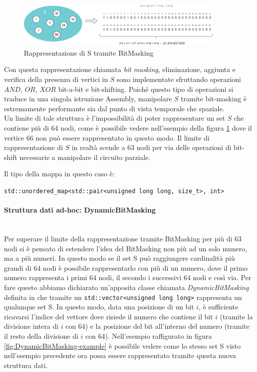 \begin{figure}[h]
	\centering
	\includegraphics[width=0.9\textwidth]{./images/BitMasking Example.png}
	\caption{Rappresentazione di S tramite BitMasking}
	\label{fig:bitmasking-example}
\end{figure}

\noindent Con questa rappresentazione chiamata \textit{bit masking}, eliminazione, aggiunta e verifica della presenza di vertici in $S$ sono implementate sfruttando operazioni $AND$, $OR$, $XOR$ bit-a-bit e bit-shifting.
Poiché questo tipo di operazioni si traduce in una singola istruzione Assembly, manipolare $S$ tramite bit-masking è estremamente performante sia dal punto di vista temporale che spaziale. \\

\noindent Un limite di tale struttura è l'impossibilità di poter rappresentare un set $S$ che contiene più di 64 nodi, come è possibile vedere nell'esempio della figura \ref{fig:bitmasking-example} dove il vertice 66 non può essere rappresentato in questo modo. Il limite di rappresentazione di $S$ in realtà scende a 63 nodi per via delle operazioni di bit-shift necessarie a manipolare il circuito parziale.

\noindent Il tipo della mappa in questo caso è:

\begin{center}
    \texttt{std::unordered_map<std::pair<unsigned long long, size_t>, int>}
\end{center}

\paragraph{Struttura dati ad-hoc: DynamicBitMasking}\mbox{} \\

Per superare il limite della rappresentazione tramite BitMasking per più di 63 nodi si è pensato di estendere l'idea del BitMasking non più ad un solo numero, ma a più numeri. In questo modo se il set S può raggiungere cardinalità più grandi di 64 nodi è possibile rappresentarlo con più di un numero, dove il primo numero rappresenta i primi 64 nodi, il secondo i successivi 64 nodi e così via. Per fare questo abbiamo dichiarato un'apposita classe chiamata \textit{DynamicBitMasking} definita in  che tramite un \texttt{std::vector<unsigned long long>} rappresenta un qualunque set S. In questo modo, data una posizione di un bit $i$, è sufficiente ricavarsi l'indice del vettore dove risiede il numero che contiene il bit $i$ (tramite la divisione intera di $i$ con 64) e la posizione del bit all'interno del numero (tramite il resto della divisione di $i$ con 64). Nell'esempio raffigurato in figura \ref{fig:DynamicBitMasking-example} è possibile vedere come lo stesso set S visto nell'esempio precedente ora possa essere rappresentato tramite questa nuova struttura dati.

